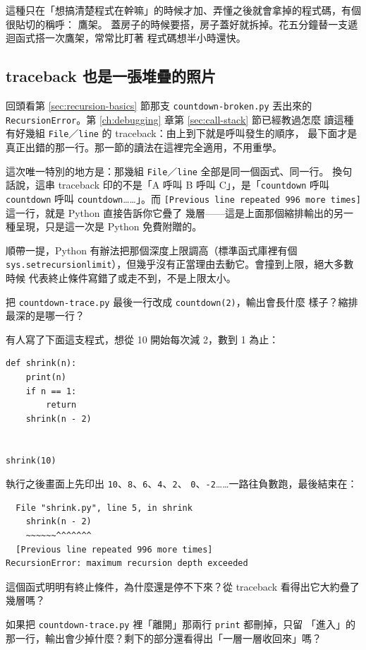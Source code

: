 這種只在「想搞清楚程式在幹嘛」的時候才加、弄懂之後就會拿掉的程式碼，有個很貼切的稱呼：
鷹架。
蓋房子的時候要搭，房子蓋好就拆掉。花五分鐘替一支遞迴函式搭一次鷹架，常常比盯著
程式碼想半小時還快。

\subsection*{traceback 也是一張堆疊的照片}

回頭看第 \ref{sec:recursion-basics} 節那支 \texttt{countdown-broken.py} 丟出來的
\texttt{RecursionError}。第 \ref{ch:debugging} 章第 \ref{sec:call-stack} 節已經教過怎麼
讀這種有好幾組 \texttt{File}／\texttt{line} 的 traceback：由上到下就是呼叫發生的順序，
最下面才是真正出錯的那一行。那一節的讀法在這裡完全適用，不用重學。

這次唯一特別的地方是：那幾組 \texttt{File}／\texttt{line} 全部是同一個函式、同一行。
換句話說，這串 traceback 印的不是「A 呼叫 B 呼叫 C」，是「\texttt{countdown} 呼叫
\texttt{countdown} 呼叫 \texttt{countdown}……」。而
\texttt{[Previous line repeated 996 more times]} 這一行，就是 Python 直接告訴你它疊了
幾層——這是上面那個縮排輸出的另一種呈現，只是這一次是 Python 免費附贈的。

順帶一提，Python 有辦法把那個深度上限調高（標準函式庫裡有個
\texttt{sys.setrecursionlimit}），但幾乎沒有正當理由去動它。會撞到上限，絕大多數時候
代表終止條件寫錯了或走不到，不是上限太小。

\begin{drills}[label=drills:recursion-trace]
\item 把 \texttt{countdown-trace.py} 最後一行改成 \texttt{countdown(2)}，輸出會長什麼
樣子？縮排最深的是哪一行？
\item 有人寫了下面這支程式，想從 10 開始每次減 2，數到 1 為止：
\begin{verbatim}
def shrink(n):
    print(n)
    if n == 1:
        return
    shrink(n - 2)


shrink(10)
\end{verbatim}
執行之後畫面上先印出 \texttt{10}、\texttt{8}、\texttt{6}、\texttt{4}、\texttt{2}、
\texttt{0}、\texttt{-2}……一路往負數跑，最後結束在：
\begin{verbatim}
  File "shrink.py", line 5, in shrink
    shrink(n - 2)
    ~~~~~~^^^^^^^
  [Previous line repeated 996 more times]
RecursionError: maximum recursion depth exceeded
\end{verbatim}
這個函式明明有終止條件，為什麼還是停不下來？從 traceback 看得出它大約疊了幾層嗎？
\item 如果把 \texttt{countdown-trace.py} 裡「離開」那兩行 \texttt{print} 都刪掉，只留
「進入」的那一行，輸出會少掉什麼？剩下的部分還看得出「一層一層收回來」嗎？
\end{drills}

